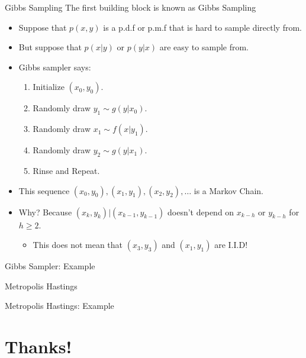 \documentclass[aspectratio=169]{beamer}
\begin{document}
\begin{frame}{Gibbs Sampling}
The first building block is known as \alert{Gibbs Sampling}
\begin{itemize}
\item Suppose that $p(x,y)$ is a p.d.f or p.m.f that is hard to sample directly from.
\item But suppose that $p(x | y)$ or $p(y | x)$ are easy to sample from.
\item Gibbs sampler says:
\begin{enumerate}
\item Initialize $(x_0,y_0)$.
\item Randomly draw $y_1 \sim g(y | x_0)$.
\item Randomly draw $x_1 \sim f(x | y_1)$.
\item Randomly draw $y_2 \sim g(y | x_1)$.
\item Rinse and Repeat. 
\end{enumerate}
\item This sequence $(x_0,y_0),(x_1,y_1), (x_2,y_2), \ldots$ is a \alert{Markov Chain}.
\item Why? Because $(x_k,y_k) | (x_{k-1},y_{k-1})$ doesn't depend on $x_{k-h}$ or $y_{k-h}$ for $h \geq 2$.
\begin{itemize}
\item This does not mean that $(x_3,y_3)$ and $(x_1,y_1)$ are I.I.D!
\end{itemize}
\end{itemize}
\end{frame}

\begin{frame}{Gibbs Sampler: Example}
\end{frame}

\begin{frame}{Metropolis Hastings}
\end{frame}

\begin{frame}{Metropolis Hastings: Example}
\end{frame}

\section*{Thanks!}
\end{document}
